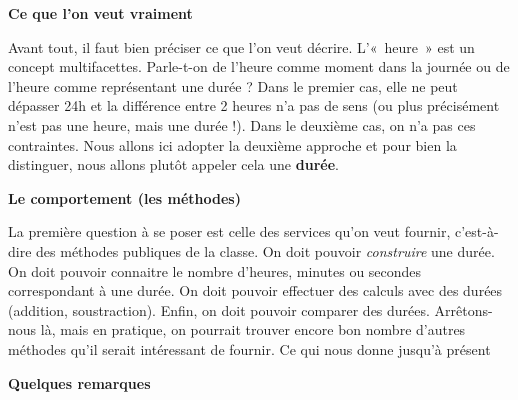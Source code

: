 {\sffamily\bfseries\upshape
Ce que l’on veut vraiment}

{
Avant tout, il faut bien préciser ce que l’on veut décrire. L’«~heure~»
est un concept multifacettes. Parle-t-on de l’heure comme moment dans
la journée ou de l’heure comme représentant une durée ? Dans le premier
cas, elle ne peut dépasser 24h et la différence entre 2 heures n’a pas
de sens (ou plus précisément n’est pas une heure, mais une durée !).
Dans le deuxième cas, on n’a pas ces contraintes. Nous allons ici
adopter la deuxième approche et pour bien la distinguer, nous allons
plutôt appeler cela une \textbf{durée}.}

{\sffamily\bfseries\upshape
Le comportement (les méthodes)}

{
La première question à se poser est celle des services qu’on veut
fournir, c’est-à-dire des méthodes publiques de la classe. On doit
pouvoir \textit{construire} une durée. On doit pouvoir connaitre le
nombre d’heures, minutes ou secondes correspondant à une durée. On doit
pouvoir effectuer des calculs avec des durées (addition, soustraction).
Enfin, on doit pouvoir comparer des durées. Arrêtons-nous là, mais en
pratique, on pourrait trouver encore bon nombre d’autres méthodes qu’il
serait intéressant de fournir. Ce qui nous donne jusqu’à présent}


\bigskip

{\bfseries
Quelques remarques}

